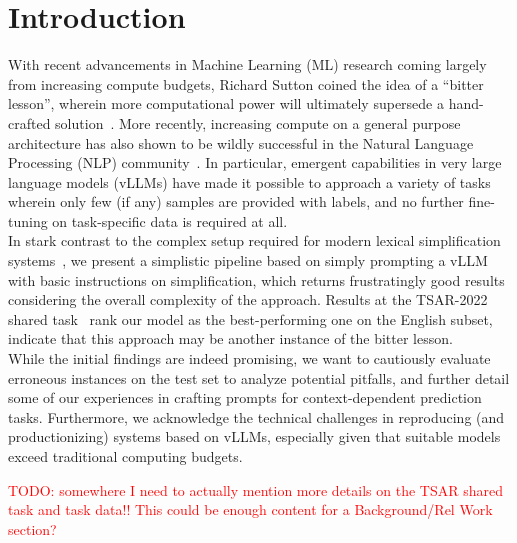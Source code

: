 \documentclass[11pt]{article}
\newcommand{\todo}[1]{\textcolor{red}{TODO: #1}}
\begin{document}
\section{Introduction}
With recent advancements in Machine Learning (ML) research coming largely from increasing compute budgets, Richard Sutton coined the idea of a ``bitter lesson'', wherein more computational power will ultimately supersede a hand-crafted solution~\cite{sutton-2019-bitter}.
More recently, increasing compute on a general purpose architecture has also shown to be wildly successful in the Natural Language Processing (NLP) community~\cite{vaswani-etal-2017-attention,wei-etal-2022-emergent}.
In particular, emergent capabilities in very large language models (vLLMs) have made it possible to approach a variety of tasks wherein only few (if any) samples are provided with labels, and no further fine-tuning on task-specific data is required at all.\\
In stark contrast to the complex setup required for modern lexical simplification systems~\cite{ferres-etal-2017-adaptable,qiang-etal-2020-lexical,stajner-etal-2022-lexical}, we present a simplistic pipeline based on simply prompting a vLLM with basic instructions on simplification, which returns frustratingly good results considering the overall complexity of the approach.
Results at the TSAR-2022 shared task~\cite{tsar-2022-findings} rank our model as the best-performing one on the English subset, indicate that this approach may be another instance of the bitter lesson.\\
While the initial findings are indeed promising, we want to cautiously evaluate erroneous instances on the test set to analyze potential pitfalls, and further detail some of our experiences in crafting prompts for context-dependent prediction tasks.
Furthermore, we acknowledge the technical challenges in reproducing (and productionizing) systems based on vLLMs, especially given that suitable models exceed traditional computing budgets.

\todo{somewhere I need to actually mention more details on the TSAR shared task and task data!! This could be enough content for a Background/Rel Work section?}
\end{document}
